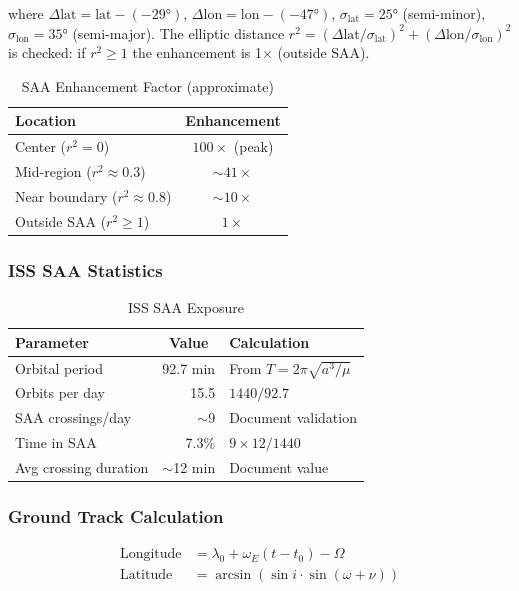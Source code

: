 \documentclass[11pt,a4paper]{article}
\begin{document}
where $\Delta\text{lat} = \text{lat} - (-29°)$, $\Delta\text{lon} = \text{lon} - (-47°)$, $\sigma_{\text{lat}} = 25°$ (semi-minor), $\sigma_{\text{lon}} = 35°$ (semi-major). The elliptic distance $r^2 = (\Delta\text{lat}/\sigma_{\text{lat}})^2 + (\Delta\text{lon}/\sigma_{\text{lon}})^2$ is checked: if $r^2 \geq 1$ the enhancement is 1$\times$ (outside SAA).

\begin{table}[htbp]
\centering
\caption{SAA Enhancement Factor (approximate)}
\begin{tabular}{@{}lc@{}}
\toprule
\textbf{Location} & \textbf{Enhancement} \\ \midrule
Center ($r^2 = 0$) & $100\times$ (peak) \\
Mid-region ($r^2 \approx 0.3$) & $\sim 41\times$ \\
Near boundary ($r^2 \approx 0.8$) & $\sim 10\times$ \\
Outside SAA ($r^2 \geq 1$) & $1\times$ \\ \bottomrule
\end{tabular}
\end{table}

\subsubsection{ISS SAA Statistics}

\begin{table}[htbp]
\centering
\caption{ISS SAA Exposure}
\begin{tabular}{@{}lrl@{}}
\toprule
\textbf{Parameter} & \multicolumn{1}{c}{\textbf{Value}} & \textbf{Calculation} \\ \midrule
Orbital period & 92.7 min & From $T = 2\pi \sqrt{a^3/\mu}$ \\
Orbits per day & 15.5 & $1440 / 92.7$ \\
SAA crossings/day & $\sim$9 & Document validation \\
Time in SAA & 7.3\% & $9 \times 12 / 1440$ \\
Avg crossing duration & $\sim$12 min & Document value \\ \bottomrule
\end{tabular}
\end{table}

\subsubsection{Ground Track Calculation}

\begin{align}
\text{Longitude} &= \lambda_0 + \omega_E (t - t_0) - \Omega \\
\text{Latitude} &= \arcsin(\sin i \cdot \sin(\omega + \nu))
\end{align}
\end{document}
